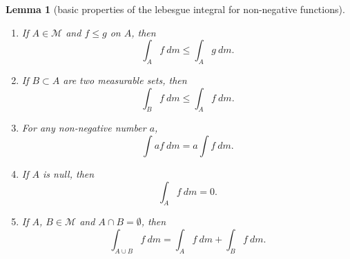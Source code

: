\documentclass[a4paper]{scrartcl}
\theoremstyle{definition}
\theoremstyle{plain}
\newtheorem{lemma}{Lemma}[section]
\theoremstyle{remark}
\begin{document}
\begin{lemma}[basic properties of the lebesgue integral for non-negative functions]
  \label{lemma:basicpropertiesoflebesgueintegralofnonnegativefunction}
  $\,$
  \begin{enumerate}
    \item If $A \in \mathcal{M}$ and $f \leq g$ on $A$, then
      \begin{equation*}
        \int_{A} f\ dm \leq \int_{A} g\ dm.
      \end{equation*}

    \item If $B \subset A$ are two measurable sets, then
      \begin{equation*}
        \int_{B} f\ dm \leq \int_{A} f\ dm.
      \end{equation*}

    \item For any non-negative number $a$,
      \begin{equation*}
        \int af\ dm = a \int f\ dm.
      \end{equation*}

    \item If $A$ is null, then
      \begin{equation*}
        \int_{A} f\ dm = 0.
      \end{equation*}

    \item If $A$, $B \in \mathcal{M}$ and $A \cap B = \emptyset$, then
      \begin{equation*}
        \int_{A \cup B} f\ dm = \int_{A} f\ dm + \int_{B} f\ dm.
      \end{equation*}
  \end{enumerate}
\end{lemma}
\end{document}
